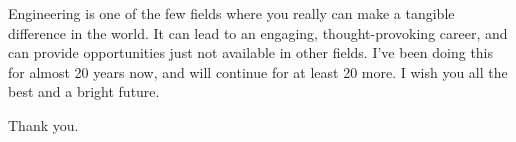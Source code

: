 \documentclass[10pt,letterpaper]{letter}
\begin{document}
Engineering is one of the few fields where you really can make a tangible difference in the world.  It can lead to an engaging, thought-provoking career, and can provide opportunities just not available in other fields.  I've been doing this for almost 20 years now, and will continue for at least 20 more.  I wish you all the best and a bright future.

Thank you.
\end{document}
